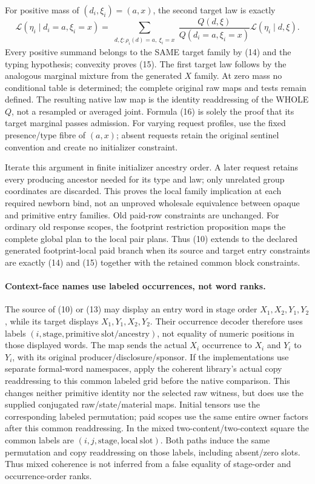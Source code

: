 \documentclass[11pt]{article}
\begin{document}
For positive mass of $(d_i,\xi_i)=(a,x)$, the second target law is exactly
\[
 \mathcal L(\eta_i\mid d_i=a,\xi_i=x)=
 \sum_{\substack{d,\xi:\rho_i(d)=a,\ \xi_i=x}}
 \frac{Q(d,\xi)}{Q(d_i=a,\xi_i=x)}
       \mathcal L(\eta_i\mid d,\xi).                         \tag{16}
\]
Every positive summand belongs to the SAME target family by (14) and the typing hypothesis; convexity proves (15). The first target law follows by the analogous marginal mixture from the generated $X$ family. At zero mass no conditional table is determined; the complete original raw maps and tests remain defined. The resulting native law map is the identity readdressing of the WHOLE $Q$, not a resampled or averaged joint. Formula (16) is solely the proof that its target marginal passes admission. For varying request profiles, use the fixed presence/type fibre of $(a,x)$; absent requests retain the original sentinel convention and create no initializer constraint.

Iterate this argument in finite initializer ancestry order. A later request retains every producing ancestor needed for its type and law; only unrelated group coordinates are discarded. This proves the local family implication at each required newborn bind, not an unproved wholesale equivalence between opaque and primitive entry families. Old paid-row constraints are unchanged. For ordinary old response scopes, the footprint restriction proposition maps the complete global plan to the local pair plans. Thus (10) extends to the declared generated footprint-local paid branch when its source and target entry constraints are exactly (14) and (15) together with the retained common block constraints.

\paragraph{Context-face names use labeled occurrences, not word ranks.}
The source of (10) or (13) may display an entry word in stage order $X_1,X_2,Y_1,Y_2$, while its target displays $X_1,Y_1,X_2,Y_2$. Their occurrence decoder therefore uses labels $(i,\mathrm{stage},\mathrm{primitive\ slot/ancestry})$, not equality of numeric positions in those displayed words. The map sends the actual $X_i$ occurrence to $X_i$ and $Y_i$ to $Y_i$, with its original producer/disclosure/sponsor. If the implementations use separate formal-word namespaces, apply the coherent library's actual copy readdressing to this common labeled grid before the native comparison. This changes neither primitive identity nor the selected raw witness, but does use the supplied conjugated raw/state/material maps. Initial tensors use the corresponding labeled permutation; paid scopes use the same entire owner factors after this common readdressing. In the mixed two-content/two-context square the common labels are $(i,j,\mathrm{stage},\mathrm{local\ slot})$. Both paths induce the same permutation and copy readdressing on those labels, including absent/zero slots. Thus mixed coherence is not inferred from a false equality of stage-order and occurrence-order ranks.
\end{document}
